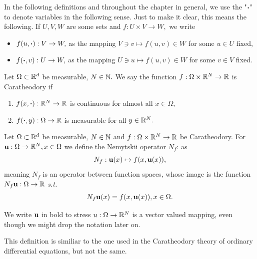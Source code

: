 \documentclass{article}
\begin{document}
\begin{remark}
    In the following definitions and throughout the chapter in general, we use the "$\vdot$" to denote variables in the following sense. Just to make it clear, this means the following.
    If $U,V,W$ are some sets and $f: U \times V \to W,$ we write
    \begin{itemize}
	    \item $f\qty(u, \vdot): V \to W,$ as the mapping $V \ni v \mapsto f(u,v) \in W$ for some $u \in U$ fixed,
	    \item $f\qty(\vdot, v): U \to W,$ as the mapping $U \ni u \mapsto f(u,v) \in W$ for some $v \in V$ fixed.
    \end{itemize}
\end{remark}

\begin{definition}
	Let $\Omega \subset {\mathbb R}^{d}$ be measurable, $N \in {\mathbb N}.$ We say the function $f: \Omega \times {\mathbb R}^{N} \to {\mathbb R}$ is Caratheodory if
	\begin{enumerate}
		\item $f\qty(x, \vdot): \R^{N} \to \R$ is continuous for almost all $x \in \Omega,$
		\item $f\qty(\vdot, y): \Omega \to \R$ is measurable for all $y \in {\mathbb R}^{N}.$
	\end{enumerate}
\end{definition}

\begin{definition}
	Let $\Omega \subset {\mathbb R}^{d}$ be measurable, $N \in {\mathbb N}$ and $f: \Omega \times {\mathbb R}^{N} \to {\mathbb R}$ be Caratheodory. For $\vb{u}: \Omega \to {\mathbb R}^N, x \in \Omega$ we define the Nemytskii operator $N_f$: as
    \[
	    N_f: \vb{u}(x) \mapsto f(x,\vb{u}(x)),
    \]
    meaning $N_f$ is an operator between function spaces, whose image is the function $N_f\vb{u}:\Omega \to {\mathbb R} $ \textit{s.t.}
    \[
	    N_f\vb{u}(x) = f\qty(x,\vb{u}(x)), x \in \Omega.
    \]
    
\end{definition}

\begin{remark}
    We write $\vb{u}$ in bold to stress $u: \Omega \to {\mathbb R}^{N}$ is a vector valued mapping, even though we might drop the notation later on.
\end{remark}

\begin{remark}
    This definition is similiar to the one used in the Caratheodory theory of ordinary differential equations, but not the same.
\end{remark}
\end{document}
